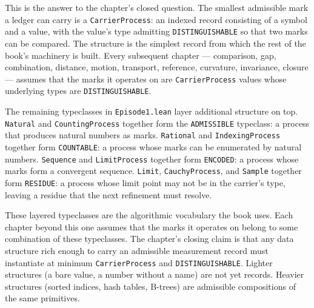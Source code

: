 This is the answer to the chapter's closed question. The smallest
admissible mark a ledger can carry is a \texttt{CarrierProcess}: an indexed
record consisting of a symbol and a value, with the value's type admitting
\texttt{DISTINGUISHABLE} so that two marks can be compared. The structure
is the simplest record from which the rest of the book's machinery is
built. Every subsequent chapter --- comparison, gap, combination, distance,
motion, transport, reference, curvature, invariance, closure --- assumes
that the marks it operates on are \texttt{CarrierProcess} values whose
underlying types are \texttt{DISTINGUISHABLE}.

The remaining typeclasses in \texttt{Episode1.lean} layer additional
structure on top. \texttt{Natural} and \texttt{CountingProcess} together
form the \texttt{ADMISSIBLE} typeclass: a process that produces natural
numbers as marks. \texttt{Rational} and \texttt{IndexingProcess} together
form \texttt{COUNTABLE}: a process whose marks can be enumerated by natural
numbers. \texttt{Sequence} and \texttt{LimitProcess} together form
\texttt{ENCODED}: a process whose marks form a convergent sequence.
\texttt{Limit}, \texttt{CauchyProcess}, and \texttt{Sample} together form
\texttt{RESIDUE}: a process whose limit point may not be in the carrier's
type, leaving a residue that the next refinement must resolve.

These layered typeclasses are the algorithmic vocabulary the book uses.
Each chapter beyond this one assumes that the marks it operates on belong
to some combination of these typeclasses. The chapter's closing claim is
that any data structure rich enough to carry an admissible measurement
record must instantiate at minimum \texttt{CarrierProcess} and
\texttt{DISTINGUISHABLE}. Lighter structures (a bare value, a number
without a name) are not yet records. Heavier structures (sorted indices,
hash tables, B-trees) are admissible compositions of the same primitives.


